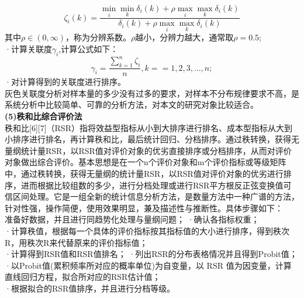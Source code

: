 \documentclass[UTF8]{article}
\begin{document}
                \begin{equation}
                    \zeta_i(k)=\frac{\min\limits_{i}\min\limits_{k}\delta_i(k)+\rho\max\limits_{i}\max\limits_{k}\delta_i(k)}{\delta_i(k)+\rho\max\limits_{i}\max\limits_{k}\delta_i(k)}
                \end{equation}
            其中$\rho\in(0,\infty)$，称为分辨系数。$\rho$越小，分辨力越大，通常取$\rho=0.5$;\\
            ·计算关联度$\gamma_i$,计算公式如下：\\
                \begin{equation}
                    \gamma_i = \frac{\sum_{k=1}^n \zeta_i}{n},k==1,2,3,...,n;
                \end{equation}
            ·对计算得到的关联度进行排序。\\
            灰色关联度分析对样本量的多少没有过多的要求，对样本不分布规律要求不高，是系统分析中比较简单、可靠的分析方法，对本文的研究对象比较适合。\\
            \textbf{(5)秩和比综合评价法}\\
            秩和比[6][7]（RSR）指将效益型指标从小到大排序进行排名、成本型指标从大到小排序进行排名，再计算秩和比，最后统计回归、分档排序。通过秩转换，获得无量纲统计量RSR，以RSR值对评价对象的优劣直接排序或分档排序，从而对评价对象做出综合评价。基本思想是在一个n个评价对象和m个评价指标或等级矩阵中，通过秩转换，获得无量纲的统计量RSR，以RSR值对评价对象的优劣进行排序，进而根据比较组数的多少，进行分档处理或进行RSR平方根反正弦变换值可信区间处理。它是一组全新的统计信息分析方法，是数量方法中一种广谱的方法，针对性强，操作简便，使用效果明显，兼及描述性与推断性。具体步骤如下：\\
            准备好数据，并且进行同趋势化处理与量纲问题；
                ·确认各指标权重；\\
                ·计算秩值，根据每一个具体的评价指标按其指标值的大小进行排序，得到秩次R，用秩次R来代替原来的评价指标值；\\
                ·计算得到RSR值和RSR值排名；
                ·列出RSR的分布表格情况并且得到Probit值；\\
                ·以Probit值(累积频率所对应的概率单位)为自变量，以 RSR 值为因变量，计算直线回归方程，拟合所对应的RSR估计值；\\
                ·根据拟合的RSR值排序，并且进行分档等级。\\
\end{document}
